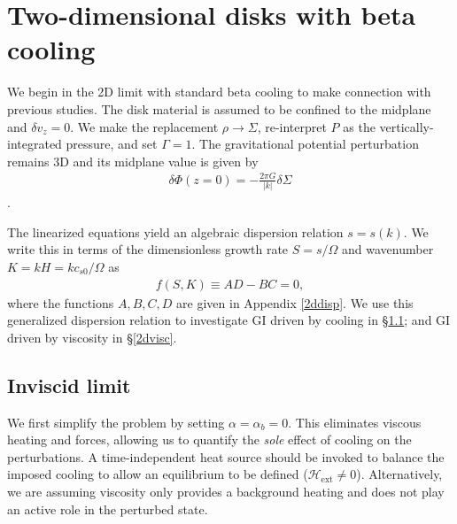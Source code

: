 \section{Two-dimensional disks with beta cooling}\label{result_2d}
We begin in the 2D limit with standard beta cooling  to make connection 
with previous studies. The disk
material is assumed to be confined to the midplane and $\delta v_z=0$. 
We make the replacement  
$\rho \to \Sigma$, re-interpret $P$ as the vertically-integrated
pressure, and set $\Gamma=1$. %
The gravitational potential perturbation remains 3D and its midplane
value is given by    
\begin{align}
  \delta \Phi(z=0) = -\frac{2 \pi G}{|k|}\delta\Sigma
\end{align}
\citep{shu70}.
 
The linearized equations yield an algebraic dispersion relation $s =
s(k)$. We write this  
in terms of the dimensionless growth rate $S = s/\Omega$ and
wavenumber $K=kH = k c_{s0}/\Omega$ as
\begin{align}\label{thindisk}
  f(S,K)\equiv AD - BC = 0,   
\end{align}
where the functions $A,B,C,D$ are given in Appendix \ref{2ddisp}. %
We use this generalized dispersion relation  to investigate GI driven 
by cooling in \S\ref{2d_inviscid}; and GI driven by viscosity 
in \S\ref{2dvisc}. 




\subsection{Inviscid limit}\label{2d_inviscid}
We first simplify the problem by setting $\alpha = \alpha_b = 0$. This
eliminates viscous heating and forces, allowing us to quantify the 
\emph{sole} effect of cooling on the 
perturbations. A time-independent heat source should be
invoked to balance the imposed cooling to allow an equilibrium to be
defined ($\mathcal{H}_\mathrm{ext}\neq 0$). Alternatively, we are
assuming viscosity only provides a background heating and does not
play an active role in the perturbed state. %

